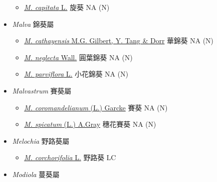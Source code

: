 \begin{itemize}
  \begin{itemize}
        \item[] \href{http://www.theplantlist.org/tpl1.1/search?q=Malachra+capitata}{\textit{M. capitata} L.}   旋葵   NA (N)
  \end{itemize}
 \item[] \textit{Malva} 錦葵屬
                                
  \begin{itemize}
        \item[] \href{http://www.theplantlist.org/tpl1.1/search?q=Malva+cathayensis}{\textit{M. cathayensis} M.G. Gilbert, Y. Tang \& Dorr}   華錦葵   NA (N)
        \item[] \href{http://www.theplantlist.org/tpl1.1/search?q=Malva+neglecta}{\textit{M. neglecta} Wall.}   圓葉錦葵   NA (N)
        \item[] \href{http://www.theplantlist.org/tpl1.1/search?q=Malva+parviflora}{\textit{M. parviflora} L.}   小花錦葵   NA (N)
  \end{itemize}
 \item[] \textit{Malvastrum} 賽葵屬
                                
  \begin{itemize}
        \item[] \href{http://www.theplantlist.org/tpl1.1/search?q=Malvastrum+coromandelianum}{\textit{M. coromandelianum} (L.) Garcke}   賽葵   NA (N)
        \item[] \href{http://www.theplantlist.org/tpl1.1/search?q=Malvastrum+spicatum}{\textit{M. spicatum} (L.) A.Gray}   穗花賽葵   NA (N)
  \end{itemize}
 \item[] \textit{Melochia} 野路葵屬
                                
  \begin{itemize}
        \item[] \href{http://www.theplantlist.org/tpl1.1/search?q=Melochia+corchorifolia}{\textit{M. corchorifolia} L.}   野路葵   LC
  \end{itemize}
 \item[] \textit{Modiola} 蔓葵屬
                                

\end{itemize}
